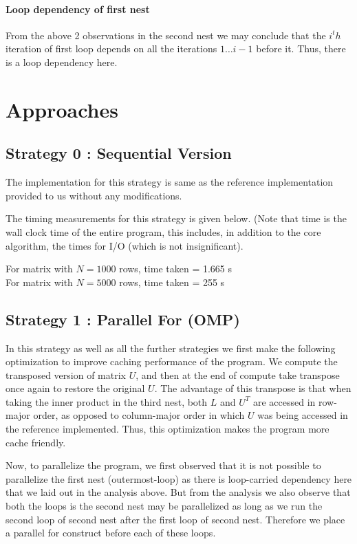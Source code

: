 \documentclass{article}
\begin{document}
\paragraph{Loop dependency of first nest} From the above 2 observations in the second nest we may conclude that the $i^th$ iteration of first loop depends on all the iterations $1 \ldots i-1$ before it. Thus, there is a loop dependency here.

\section{Approaches}
\subsection{Strategy 0 : Sequential Version}
The implementation for this strategy is same as the reference implementation provided to us without any modifications.

The timing measurements for this strategy is given below. (Note that time is the wall clock time of the entire program, this includes, in addition to the core algorithm, the times for I/O (which is not insignificant).

For matrix with $N=1000$ rows, time taken = 1.665 s\\
For matrix with $N=5000$ rows, time taken = 255 s

\subsection{Strategy 1 : Parallel For (OMP)}
In this strategy as well as all the further strategies we first make the following optimization to improve caching performance of the program.
We compute the transposed version of matrix $U$, and then at the end of compute take transpose once again to restore the original $U$.
The advantage of this transpose is that when taking the inner product in the third nest, both $L$ and $U^T$ are accessed in row-major order,
as opposed to column-major order in which $U$ was being accessed in the reference implemented.
Thus, this optimization makes the program more cache friendly.

Now, to parallelize the program, we first observed that it is not possible to parallelize the first nest (outermost-loop) as there is loop-carried dependency here that we laid out in the analysis above. But from the analysis we also observe that both the loops is the second nest may be parallelized as long as we run the second loop of second nest after the first loop of second nest. Therefore we place a parallel for construct before each of these loops.
\end{document}
